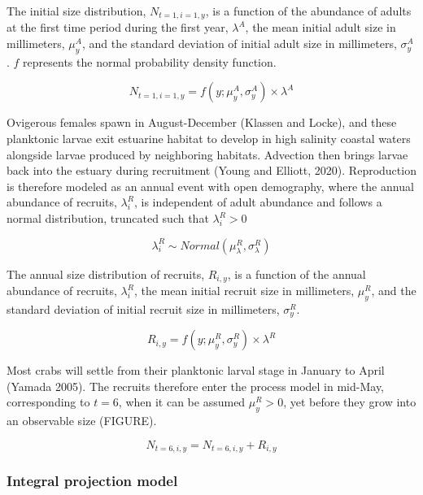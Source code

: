 \documentclass{article}
\begin{document}
The initial size distribution, $N_{t=1, i=1, y}$, is a function of the abundance of adults at the first time period during the first year, $\lambda^{A}$, the mean initial adult size in millimeters, $\mu^A_{y}$, and the standard deviation of initial adult size in millimeters, $\sigma^A_{y}$. $f$ represents the normal probability density function.

\begin{equation}
N_{t=1, i=1, y} = f(y; \mu^A_{y}, \sigma^A_{y}) \times \lambda^A
\end{equation}

Ovigerous females spawn in August-December (Klassen and Locke), and these planktonic larvae exit estuarine habitat to develop in high salinity coastal waters alongside larvae produced by neighboring habitats. Advection then brings larvae back into the estuary during recruitment (Young and Elliott, 2020). Reproduction is therefore modeled as an annual event with open demography, where the annual abundance of recruits, $\lambda^R_i$, is independent of adult abundance and follows a normal distribution, truncated such that $\lambda^R_i > 0$  

\begin{equation}
\lambda^R_i \sim Normal(\mu^R_{\lambda}, \sigma^R_{\lambda})
\end{equation}

The annual size distribution of recruits, $R_{i, y}$, is a function of the annual abundance of recruits, $\lambda^R_i$, the mean initial recruit size in millimeters, $\mu^R_y$, and the standard deviation of initial recruit size in millimeters, $\sigma^R_y$.

\begin{equation}
R_{i, y} = f(y; \mu^R_{y}, \sigma^R_{y}) \times \lambda^R
\end{equation}

Most crabs will settle from their planktonic larval stage in January to April (Yamada 2005). The recruits therefore enter the process model in mid-May, corresponding to $t=6$, when it can be assumed $\mu^R_y > 0$, yet before they grow into an observable size (FIGURE).

\begin{equation}
N_{t=6, i, y} =  N_{t=6, i, y} + R_{i, y}
\end{equation}

\subsubsection*{Integral projection model}
\end{document}
